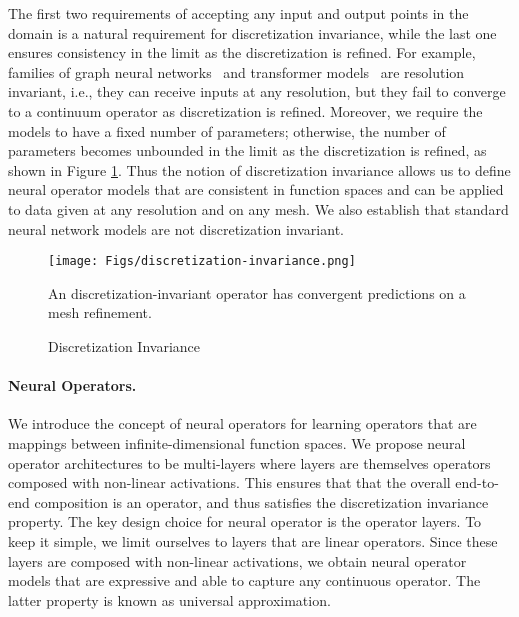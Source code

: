 \noindent The first two requirements of accepting any input and output points in the domain is a natural requirement for discretization invariance, while the last one ensures consistency in the limit as the discretization is refined. For example, families of graph neural networks~\citep{scarselli2008graph} and transformer models~\citep{vaswani2017attention} are resolution invariant, i.e., they can receive inputs at any resolution, but they fail to converge to a continuum operator as discretization is refined. Moreover, we require the models to have a fixed number of parameters; otherwise, the number of parameters becomes unbounded in the limit as the discretization is refined, as shown in Figure \ref{fig:discretization-invariance}.  Thus the notion of discretization invariance allows us to define neural operator models that are consistent in function spaces and can be applied to data given at any resolution and on any mesh. We also establish that standard neural network models are not discretization invariant.





\begin{figure}[h]
    \centering
    \texttt{[image: Figs/discretization-invariance.png]}
    \caption{Discretization Invariance}
    \label{fig:discretization-invariance}
    An discretization-invariant operator has convergent predictions on a mesh refinement.
\end{figure}

\paragraph{Neural Operators.}


We introduce the concept of neural operators   for learning operators that are  mappings between infinite-dimensional function spaces. We propose neural operator architectures to be multi-layers where layers  are themselves operators composed with non-linear activations. This ensures that that the overall end-to-end composition  is an operator, and thus satisfies the discretization invariance property. The key design choice for neural operator is the operator layers. To keep it simple, we limit ourselves to layers that are linear operators. Since these layers are composed with non-linear activations, we obtain neural operator models that are expressive and able to capture any continuous operator. The latter property is known as universal approximation. 

